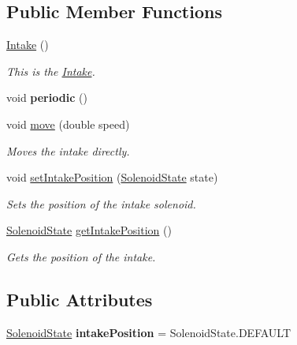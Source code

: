 \subsection*{Public Member Functions}
\begin{DoxyCompactItemize}
\item 
\mbox{\label{classfrc_1_1robot_1_1subsystems_1_1_intake_a5ba00d335623767efcf651fae08188fa}} 
\mbox{\hyperlink{classfrc_1_1robot_1_1subsystems_1_1_intake_a5ba00d335623767efcf651fae08188fa}{Intake}} ()
\begin{DoxyCompactList}\small\item\em This is the \mbox{\hyperlink{classfrc_1_1robot_1_1subsystems_1_1_intake}{Intake}}. \end{DoxyCompactList}\item 
\mbox{\label{classfrc_1_1robot_1_1subsystems_1_1_intake_aad9fbe09b1078260592be68116cdb31f}} 
void {\bfseries periodic} ()
\item 
void \mbox{\hyperlink{classfrc_1_1robot_1_1subsystems_1_1_intake_a2d6ff9d70f7fdb3d7eb4d8f697015024}{move}} (double speed)
\begin{DoxyCompactList}\small\item\em Moves the intake directly. \end{DoxyCompactList}\item 
void \mbox{\hyperlink{classfrc_1_1robot_1_1subsystems_1_1_intake_af3858233c58370b640d5a4d2871d72dd}{set\+Intake\+Position}} (\mbox{\hyperlink{enumfrc_1_1robot_1_1enums_1_1_solenoid_state}{Solenoid\+State}} state)
\begin{DoxyCompactList}\small\item\em Sets the position of the intake solenoid. \end{DoxyCompactList}\item 
\mbox{\hyperlink{enumfrc_1_1robot_1_1enums_1_1_solenoid_state}{Solenoid\+State}} \mbox{\hyperlink{classfrc_1_1robot_1_1subsystems_1_1_intake_a485144b4bbb9087a23b03d260d44a1e6}{get\+Intake\+Position}} ()
\begin{DoxyCompactList}\small\item\em Gets the position of the intake. \end{DoxyCompactList}\end{DoxyCompactItemize}
\subsection*{Public Attributes}
\begin{DoxyCompactItemize}
\item 
\mbox{\label{classfrc_1_1robot_1_1subsystems_1_1_intake_a16b29fb2a997be9a0dc7fba1e371dc2b}} 
\mbox{\hyperlink{enumfrc_1_1robot_1_1enums_1_1_solenoid_state}{Solenoid\+State}} {\bfseries intake\+Position} = Solenoid\+State.\+D\+E\+F\+A\+U\+LT
\end{DoxyCompactItemize}
